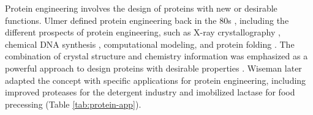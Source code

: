\begin{refsection}
Protein engineering involves the design of proteins with new or desirable
functions. Ulmer  defined protein engineering back
in the 80s \cite{Ulmer1983}, including the different prospects of
protein engineering, such as X-ray crystallography \cite{Takeda2006}, chemical
DNA synthesis \cite{Pannekoek1979}, computational modeling, and protein folding
\cite{Ulmer1983}. The combination of crystal structure and chemistry
information was emphasized as a powerful approach to design proteins with
desirable properties \cite{Ulmer1983}. Wiseman  later adapted the
concept with specific applications for protein engineering, including improved
proteases for the detergent industry \cite{Wiseman1993,Harwood1992} and
imobilized lactase for food precessing \cite{Wiseman1993} (Table
\ref{tab:protein-app}). 


\end{refsection}
